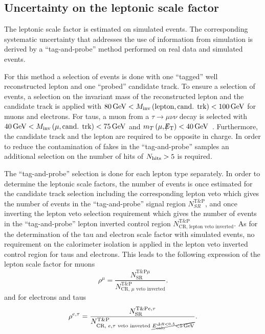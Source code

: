 \subsection{Uncertainty on the leptonic scale factor}
\label{sec:LeptonScaleUncertainty}

The leptonic scale factor \leptonscalefactor is estimated on simulated \WJets events.
The corresponding systematic uncertainty that addresses the use of information from simulation is derived by a ``tag-and-probe'' method performed on real data and simulated events.

For this method a selection of \Zlep events is done with one ``tagged'' well reconstructed lepton and one ``probed'' candidate track.
To ensure a selection of \Zlep events, a selection on the invariant mass of  the reconstructed lepton and the candidate track is applied with $80\,\text{Ge}\kern-0.06667em\text{V}<M_{\text{inv}}\left( \text{lepton}, \text{cand. trk}  \right)<100\,\text{Ge}\kern-0.06667em\text{V}$ for muons and electrons.
For taus, a muon from a $\tau\rightarrow\mu\nu\nu$ decay is selected with $40\,\text{Ge}\kern-0.06667em\text{V}<M_{\text{inv}}\left( \mu, \text{cand. trk}  \right)<75\,\text{Ge}\kern-0.06667em\text{V}$ and $m_T\left(\mu,\slash\mkern-12mu{E}_{\text{T}}\right)<40\,\text{Ge}\kern-0.06667em\text{V}$~\cite{bib:CMS:DT_Thesis,bib:CMS:DT_8TeV_AN}.
Furthermore, the candidate track and the lepton are required to be opposite in charge.
In order to reduce the contamination of fakes in the ``tag-and-probe'' samples an additional selection on the number of hits of $N_{\text{hits}}>5$ is required.

The ``tag-and-probe'' selection is done for each lepton type separately.
In order to determine the leptonic scale factors, the number of events is once estimated for the candidate track selection including the corresponding lepton veto which gives the number of events in the ``tag-and-probe'' signal region $N_{SR}^{\text{T\&P}}$, and once inverting the lepton veto selection requirement which gives the number of events in the ``tag-and-probe'' lepton inverted control region $N_{\text{CR, lepton veto inverted}}^{\text{T\&P}}$.
As for the determination of the tau and electron scale factor with simulated \WJets events, no requirement on the calorimeter isolation is applied in the lepton veto inverted control region for taus and electrons.
This leads to the following expression of the lepton scale factor for muons
\begin{equation*}
\rho^{\mu} = \frac{N_{\text{SR}}^{\text{T\&P}\mu}}{N_{\text{CR, }\mu\text{ veto inverted}}^{\text{T\&P}}}.
\end{equation*}
and for electrons and taus 
\begin{equation*}
\rho^{e,\tau} = \frac{N_{\text{SR}}^{\text{T\&P}e,\tau}}{N_{\text{CR, }e,\tau \text{ veto inverted } \cancel{E^{\Delta R<0.5}_{\text{calo}}<5\,\text{Ge}\kern-0.06667em\text{V}}}^{\text{T\&P}}}.
\end{equation*}

